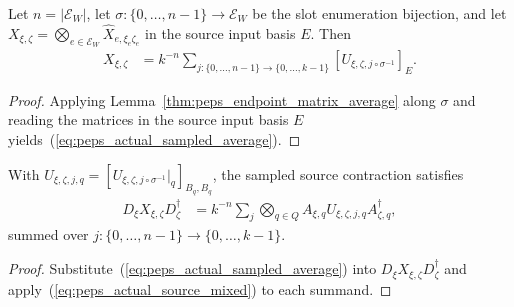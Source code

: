 \begin{lemma}
    \label{thm:peps_actual_sampled_endpoint_average}
    \leanok
    Let $n=|\mathcal E_W|$, let $\sigma:\{0,\ldots,n-1\}\to\mathcal E_W$ be the
    slot enumeration bijection, and let $X_{\xi,\zeta}=\bigotimes_{e\in\mathcal E_W}\widehat X_{e,\xi_e\zeta_e}$
    in the source input basis $E$. Then
    \begin{align}
        X_{\xi,\zeta}
         & =k^{-n}\sum_{j:\{0,\ldots,n-1\}\to\{0,\ldots,k-1\}}
        [U_{\xi,\zeta,j\circ\sigma^{-1}}]_E.
        \label{eq:peps_actual_sampled_average}
    \end{align}
\end{lemma}

\begin{proof}\leanok
    Applying Lemma~\ref{thm:peps_endpoint_matrix_average} along $\sigma$ and
    reading the matrices in the source input basis $E$
    yields~(\ref{eq:peps_actual_sampled_average}).
\end{proof}

\begin{lemma}
    \label{thm:peps_actual_sampled_party_contraction}
    \leanok
    With $U_{\xi,\zeta,j,q}=[U_{\xi,\zeta,j\circ\sigma^{-1}}|_q]_{B_q,B_q}$,
    the sampled source contraction satisfies
    \begin{align}
        D_\xi X_{\xi,\zeta}D_\zeta^\dagger
         & =k^{-n}\sum_j\bigotimes_{q\in Q}
        A_{\xi,q}U_{\xi,\zeta,j,q}A_{\zeta,q}^\dagger,
        \label{eq:peps_actual_sampled_contraction}
    \end{align}
    summed over $j:\{0,\ldots,n-1\}\to\{0,\ldots,k-1\}$.
\end{lemma}

\begin{proof}\leanok
    Substitute~(\ref{eq:peps_actual_sampled_average}) into
    $D_\xi X_{\xi,\zeta}D_\zeta^\dagger$ and apply~(\ref{eq:peps_actual_source_mixed})
    to each summand.
\end{proof}



